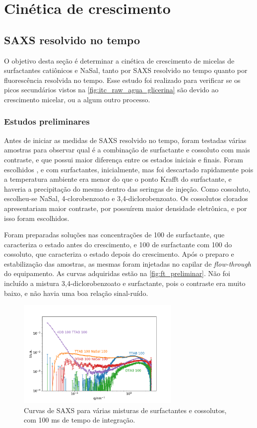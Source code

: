 	
\part{Cinética de crescimento}
	\chapter{SAXS resolvido no tempo}
	O objetivo desta seção é determinar a cinética de crescimento de micelas de surfactantes catiônicos e NaSal, tanto por SAXS resolvido no tempo quanto por fluorescência resolvida no tempo. Esse estudo foi realizado para verificar se os picos secundários vistos na \autoref{fig:itc_raw_agua_glicerina} são devido ao crescimento micelar, ou a algum outro processo.
	
	\section{Estudos preliminares} 
	Antes de iniciar as medidas de SAXS resolvido no tempo, foram testadas várias amostras para observar qual é a combinação de surfactante e cossoluto com mais contraste, e que possui maior diferença entre os estados iniciais e finais. Foram escolhidos \CTAB, \TTAB{} e \DTAB{} com surfactantes, inicialmente, mas \CTAB{} foi descartado rapidamente pois a temperatura ambiente era menor do que o ponto Krafft do surfactante, e haveria a precipitação do mesmo dentro das seringas de injeção. Como cossoluto, escolheu-se NaSal, 4-clorobenzoato e 3,4-diclorobenzoato. Os cossolutos clorados apresentariam maior contraste, por possuírem maior densidade eletrônica, e por isso foram escolhidos.
	
	Foram preparadas soluções nas concentrações de 100 \mM{} de surfactante, que caracteriza o estado antes do crescimento, e 100 \mM{} de surfactante com 100 \mM{} do cossoluto, que caracteriza o estado depois do crescimento. Após o preparo e estabilização das amostras, as mesmas foram injetadas no capilar de \emph{flow-through} do equipamento. As curvas adquiridas estão na \autoref{fig:ft_preliminar}. Não foi incluído a mistura 3,4-diclorobenzoato e surfactante, pois o contraste era muito baixo, e não havia uma boa relação sinal-ruído.
	
	\begin{figure}[h]
		\centering
		\includegraphics[width=0.7\textwidth]{imagens/saxs/FT_amostras}
		\caption{Curvas de SAXS para várias misturas de surfactantes e cossolutos, com 100 ms de tempo de integração.}
		\label{fig:ft_preliminar}
	\end{figure}

